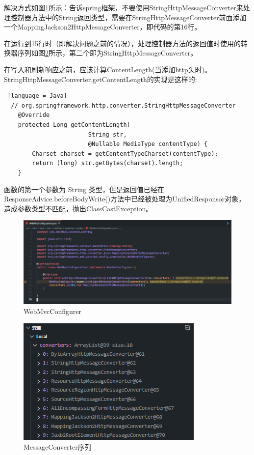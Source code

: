 解决方式如图\ref{WebMvcConfigurer}所示：告诉spring框架，不要使用StringHttpMessageConverter来处理控制器方法中的String返回类型，需要在StringHttpMessageConverter前面添加一个MappingJackson2HttpMessageConverter，即代码的第16行。

在运行到15行时（即解决问题之前的情况），处理控制器方法的返回值时使用的转换器序列如图\ref{MessageConverter-list}所示，第二个即为StringHttpMessageConverter。

在写入和刷新响应之前，应该计算ContentLength(当添加http头时)。StringHttpMessageConverter.getContentLength的实现是这样的:
\begin{lstlisting} [language = Java]
  // org.springframework.http.converter.StringHttpMessageConverter
	@Override
	protected Long getContentLength(
                        String str, 
                        @Nullable MediaType contentType) {
		Charset charset = getContentTypeCharset(contentType);
		return (long) str.getBytes(charset).length;
	}
\end{lstlisting}

函数的第一个参数为 String 类型，但是返回值已经在ResponseAdvice.beforeBodyWrite()方法中已经被处理为UnifiedResponsor对象，造成参数类型不匹配，抛出ClassCastException。

\begin{figure}[htbp]
  \centering
  \includegraphics[scale = 0.6]{out/figure/统一返回对象/WebMvcConfiguration-MessageConverter-Code.png}
  \caption{\song\wuhao WebMvcConfigurer}
  \label{WebMvcConfigurer}
\end{figure}

\begin{figure}[htbp]
  \centering
  \includegraphics[scale = 0.8]{out/figure/统一返回对象/WebMvcConfiguration-MessageConverter-debug.png}
  \caption{\song\wuhao MessageConverter序列}
  \label{MessageConverter-list}
\end{figure}

